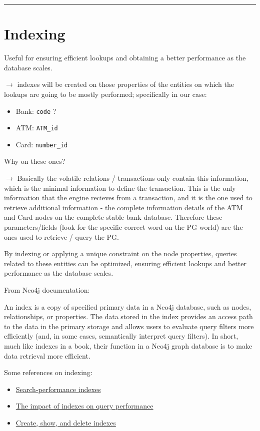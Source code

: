 \documentclass{article}
\begin{document}
\textcolor{green}{\rule{\linewidth}{0.4mm}}

\section{Indexing}

Useful for ensuring efficient lookups and obtaining a better performance as the database 
scales.

$\rightarrow$ indexes will be created on those properties of the entities on which the 
lookups are going to be mostly performed; specifically in our case:
\begin{itemize}
  \item Bank: \texttt{code} ?
  \item ATM: \texttt{ATM\_id}
  \item Card: \texttt{number\_id}
\end{itemize}

Why on these ones?

$\rightarrow$ Basically the volatile relations / transactions only contain this information,
which is the minimal information to define the transaction. This is the only information that
the engine recieves from a transaction, and it is the one used to retrieve additional information - the complete information details of the ATM and Card nodes on the complete
stable bank database. Therefore these parameters/fields (look for the specific correct
word on the PG world) are the ones used to retrieve / query the PG. 

By indexing or applying a unique constraint on the node properties, queries related to these entities can be optimized, ensuring efficient lookups and better performance as the database scales.

From Neo4j documentation:
\begin{tcolorbox}
  An index is a copy of specified primary data in a Neo4j database, such as nodes, relationships, or properties. The data stored in the index provides an access path to the data in the primary storage and allows users to evaluate query filters more efficiently (and, in some cases, semantically interpret query filters). In short, much like indexes in a book, their function in a Neo4j graph database is to make data retrieval more efficient.
\end{tcolorbox}

Some references on indexing:
\begin{itemize}
  \item \href{https://neo4j.com/docs/cypher-manual/current/indexes/search-performance-indexes/overview/}{Search-performance indexes}
  \item \href{https://neo4j.com/docs/cypher-manual/current/indexes/search-performance-indexes/using-indexes/}{The impact of indexes on query performance}
  \item \href{https://neo4j.com/docs/cypher-manual/current/indexes/search-performance-indexes/managing-indexes/}{Create, show, and delete indexes}
\end{itemize}
\end{document}
